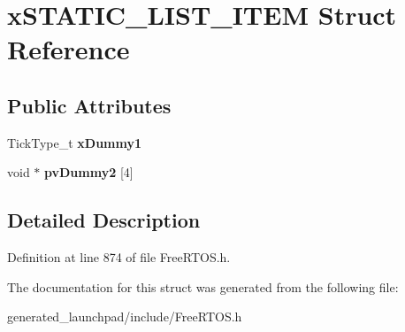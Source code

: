 \hypertarget{structxSTATIC__LIST__ITEM}{}\section{x\+S\+T\+A\+T\+I\+C\+\_\+\+L\+I\+S\+T\+\_\+\+I\+T\+EM Struct Reference}
\label{structxSTATIC__LIST__ITEM}
\subsection*{Public Attributes}
\begin{DoxyCompactItemize}
\item 
\mbox{\label{structxSTATIC__LIST__ITEM_abdb8e415f1bcfbba19fbf57d8d4e9438}} 
Tick\+Type\+\_\+t {\bfseries x\+Dummy1}
\item 
\mbox{\label{structxSTATIC__LIST__ITEM_a53c6cb2b8094f991254635d04c9be55b}} 
void $\ast$ {\bfseries pv\+Dummy2} \mbox{[}4\mbox{]}
\end{DoxyCompactItemize}


\subsection{Detailed Description}


Definition at line 874 of file Free\+R\+T\+O\+S.\+h.



The documentation for this struct was generated from the following file\+:\begin{DoxyCompactItemize}
\item 
generated\+\_\+launchpad/include/Free\+R\+T\+O\+S.\+h\end{DoxyCompactItemize}
